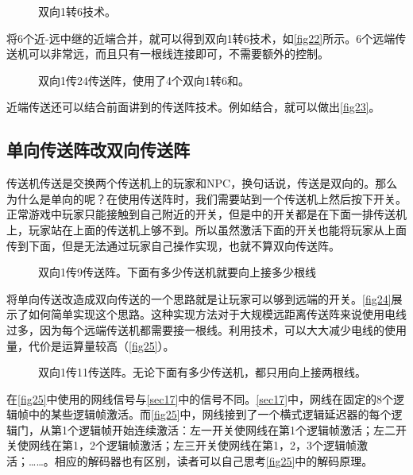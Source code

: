 \begin{figure}[!ht]
\centering
{}%
%
\caption{双向1转6技术。}\label{fig22}
\end{figure}
将6个近-远中继的近端合并，就可以得到双向1转6技术，如\autoref{fig22}所示。6个远端传送机可以非常远，而且只有一根线连接即可，不需要额外的控制。

\begin{figure}[!ht]
\centering
{}
\caption{双向1传24传送阵，使用了4个双向1转6和。}\label{fig23}
\end{figure}
近端传送还可以结合前面讲到的传送阵技术。例如结合，就可以做出\autoref{fig23}。

\subsection{单向传送阵改双向传送阵}
传送机传送是交换两个传送机上的玩家和NPC，换句话说，传送是双向的。那么为什么是单向的呢？在使用传送阵时，我们需要站到一个传送机上然后按下开关。正常游戏中玩家只能接触到自己附近的开关，但是中的开关都是在下面一排传送机上，玩家站在上面的传送机上够不到。所以虽然激活下面的开关也能将玩家从上面传到下面，但是无法通过玩家自己操作实现，也就不算双向传送阵。

\begin{figure}[!ht]
\centering
{}
\caption{双向1传9传送阵。下面有多少传送机就要向上接多少根线}\label{fig24}
\end{figure}

将单向传送改造成双向传送的一个思路就是让玩家可以够到远端的开关。\autoref{fig24}展示了如何简单实现这个思路。这种实现方法对于大规模远距离传送阵来说使用电线过多，因为每个远端传送机都需要接一根线。利用技术，可以大大减少电线的使用量，代价是运算量较高（\autoref{fig25}）。

\begin{figure}[!ht]
\centering
{}
\caption{双向1传11传送阵。无论下面有多少传送机，都只用向上接两根线。}\label{fig25}
\end{figure}

在\autoref{fig25}中使用的网线信号与\autoref{sec17}中的信号不同。\autoref{sec17}中，网线在固定的8个逻辑帧中的某些逻辑帧激活。而\autoref{fig25}中，网线接到了一个横式逻辑延迟器的每个逻辑门，从第1个逻辑帧开始连续激活：左一开关使网线在第1个逻辑帧激活；左二开关使网线在第1，2个逻辑帧激活；左三开关使网线在第1，2，3个逻辑帧激活；……。相应的解码器也有区别，读者可以自己思考\autoref{fig25}中的解码原理。


